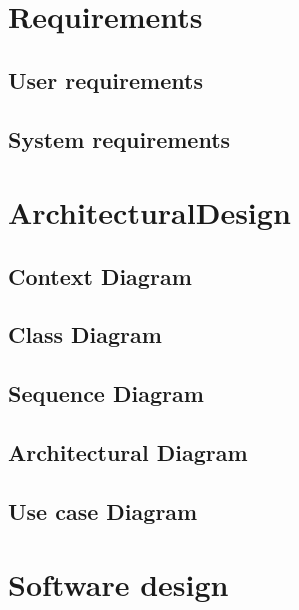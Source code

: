 \documentclass[12p]{article}
\begin{document}
		\newpage
		\section{Requirements} \label{sec:Requirements}
		
		\subsection{User requirements} \label{sec:UserRequirements}
		
		\subsection{System requirements} \label{sec:SystemRequirements}
		
				
	    \newpage
		\section{ArchitecturalDesign} \label{sec:ArchitecturalDesign}
		    \subsection{Context Diagram}
		    \subsection{Class Diagram}
		    \subsection{Sequence Diagram}
		    \subsection{Architectural Diagram}
		    \subsection{Use case Diagram}
		
		\newpage
		\section{Software design} \label{sec:SoftwareDesign}
\end{document}
